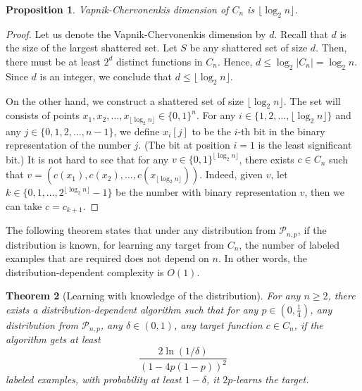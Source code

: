 \documentclass[10pt]{article}
\newtheorem{proposition}{Proposition}
\newtheorem{theorem}[proposition]{Theorem}
\renewcommand{\P}{\mathcal{P}}
\begin{document}
\begin{proposition}
\label{proposition:vc-dimension-projections}
Vapnik-Chervonenkis dimension of $C_n$ is $\lfloor \log_2 n \rfloor$.
\end{proposition}

\begin{proof}
Let us denote the Vapnik-Chervonenkis dimension by $d$. Recall that $d$ is the
size of the largest shattered set. Let $S$ be any shattered set of size $d$.
Then, there must be at least $2^d$ distinct functions in $C_n$. Hence, $d \le
\log_2 |C_n| = \log_2 n$. Since $d$ is an integer, we conclude that $d \le
\lfloor \log_2 n \rfloor$.

On the other hand, we construct a shattered set of size $\lfloor \log_2 n
\rfloor$. The set will consists of points $x_1, x_2, \dots, x_{\lfloor \log_2 n
\rfloor} \in \{0,1\}^n$. For any $i \in \{1,2,\dots,\lfloor \log_2 n \rfloor\}$
and any $j \in \{0,1,2,\dots,n-1\}$, we define $x_i[j]$ to be the $i$-th bit
in the binary representation of the number $j$. (The bit at position $i=1$ is the
least significant bit.) It is not hard to see that for any $v \in
\{0,1\}^{\lfloor \log_2 n \rfloor}$, there exists $c \in C_n$ such that $v =
(c(x_1), c(x_2), \dots, c(x_{\lfloor \log_2 n \rfloor}))$. Indeed, given $v$,
let $k \in \{0,1,\dots,2^{\lfloor \log_2 n \rfloor} - 1\}$ be the number with
binary representation $v$, then we can take $c = c_{k+1}$.
\end{proof}

The following theorem states that under any distribution from $\P_{n,p}$, if the
distribution is known, for learning any target from $C_n$, the number of
labeled examples that are required does not depend on $n$. In other
words, the distribution-dependent complexity is $O(1)$.

\begin{theorem}[Learning with knowledge of the distribution]
For any $n \ge 2$, there exists a distribution-dependent algorithm such that
for any $p \in (0,\frac{1}{4})$, any distribution from $\P_{n,p}$, any $\delta
\in (0,1)$, any target function $c \in C_n$,
if the algorithm gets at least
$$
\frac{2\ln(1/\delta)}{(1 - 4p(1-p))^2}
$$
labeled examples, with probability at least $1 - \delta$, it $2p$-learns the target.
\end{theorem}
\end{document}
